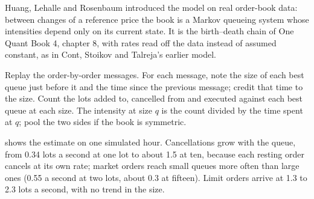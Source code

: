 Huang, Lehalle and Rosenbaum introduced the model on real order-book data: between changes of a reference price the book is a Markov queueing
system whose intensities depend only on its current state. It is the birth--death chain of One Quant Book 4, chapter 8, with rates read off the
data instead of assumed constant, as in Cont, Stoikov and Talreja's earlier model.

\begin{method}\label{met:hf:queue-reactive-models-and-large-tick-assets:estimate}
Replay the order-by-order messages. For each message, note the size of each best queue just before it and the time since the previous message;
credit that time to the size. Count the lots added to, cancelled from and executed against each best queue at each size. The intensity at size $q$
is the count divided by the time spent at $q$; pool the two sides if the book is symmetric.
\end{method}

 shows the estimate on one simulated hour. Cancellations grow with the queue,
from 0.34 lots a second at one lot to about 1.5 at ten, because each resting order cancels at its own rate; market orders reach small queues more
often than large ones (0.55 a second at two lots, about 0.3 at fifteen). Limit orders arrive at 1.3 to 2.3 lots a second, with no trend in the size.

\begin{omfigure}

\label{fig:hf:queue-reactive-models-and-large-tick-assets:intensities}
\end{omfigure}


